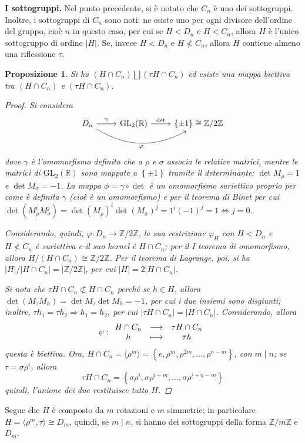 \documentclass[11pt]{scrartcl}
\theoremstyle{style1}
\newtheorem{prop}{Proposizione}[section]
\numberwithin{equation}{subsection}
\renewcommand{\textbf}[1]{\textsf{\bfseries #1}}
\begin{document}
 \textbf{I sottogruppi.} 
Nel punto precedente, si \`e notato che $C_n$ \`e uno dei sottogruppi.
Inoltre, i sottogruppi di $C_n$ sono noti: ne esiste uno per ogni divisore dell'ordine del gruppo, cio\`e $n$ in questo caso, per cui se $H < D_n$ e $H < C_n$, allora $H$ \`e l'unico sottogruppo di ordine $\lvert H \rvert $.
Se, invece $H< D_n$ e $H \not < C_n$, allora $H$ contiene almeno una riflessione $\tau $.
\begin{prop}
	Si ha $(H \cap C_n) \bigsqcup (\tau H \cap C_n) $ ed esiste una mappa biettiva tra $(H\cap C_n)$ e $(\tau H\cap C_n)$.
	\begin{proof}
		Si considera 
	\[
\begin{tikzcd}
D_n \arrow[r, "\gamma"] 
    \arrow[rr, bend right=30, "{\varphi }"'] & 
\mathrm{GL}_2(\mathbb{R}) \arrow[r, "\det"] & \{\pm 1\}\cong \mathbb{Z}/2\mathbb{Z}
\end{tikzcd}
\]
dove $\gamma$ \`e l'omomorfismo definito che a $\rho $ e $\sigma $ associa le relative matrici, mentre le matrici di $\mathrm{GL} _2(\mathbb{R})$ sono mappate a $\left\{ \pm 1 \right\} $ tramite il determinante: $\det M_\rho  = 1$ e $\det M_\sigma = -1$.
La mappa $\phi = \gamma\circ \det$ \`e un omomorfismo suriettivo proprio per come \`e definita $\gamma$ (cio\`e \`e un omomorfismo) e per il teorema di Binet per cui $\det (M^i_\rho M^j_\sigma ) = \det(M_\rho )^i \det (M_\sigma )^j = 1 ^i (-1)^j = 1 \iff j= 0$.

Considerando, quindi, $\varphi  :D_n \to \mathbb{Z} / 2\mathbb{Z}$, la sua restrizione $\varphi _H$ con $H < D_n$ e $H\not < C_n$ \`e suriettiva e il suo kernel \`e $H\cap C_n$; per il I teorema di omomorfismo, allora $H / (H\cap C_n) \cong \mathbb{Z} / 2\mathbb{Z}$.
Per il teorema di Lagrange, poi, si ha $\lvert H \rvert / \lvert H\cap C_n \rvert = \lvert \mathbb{Z} / 2 \mathbb{Z} \rvert $, per cui $\lvert H \rvert  = 2 \lvert H\cap C_n \rvert $.

Si nota che $\tau H \cap C_n \not \subset H \cap C_n$ perch\'e se $h \in H$, allora $\det (M_\tau M_h) = \det M_\tau \det M_h = -1$, per cui i due insiemi sono disgiunti; inoltre, $\tau h_1 = \tau h_2 \Rightarrow h_1=h_2$, per cui $\lvert \tau H \cap C_n \rvert = \lvert H \cap C_n \rvert $.
Considerando, allora
\[
\psi  : 
\begin{array}
	{c c c}
	H \cap C_n & \longrightarrow  & \tau  H \cap C_n\\
	h & \longmapsto &\tau  h
\end{array}
\] 
questa \`e biettiva.
Ora, $H \cap C_n = \langle \rho ^m \rangle= \left\{ e ,\rho ^m , \rho ^{2m} ,\ldots,\rho ^{n - m}  \right\} $, con $m  \mid  n$; se $\tau  = \sigma  \rho ^i $, allora 
\[
\tau  H \cap C_n = \left\{ \sigma \rho ^i, \sigma \rho ^{i+m}, \ldots, \sigma \rho ^{i+n - m}   \right\} 
\] 
quindi, l'unione dei due restituisce tutto $H$.
\end{proof}
\end{prop}
\noindent Segue che $H$ \`e composto da $m$ rotazioni e $m$ simmetrie; in particolare $H = \langle \rho ^m , \tau  \rangle\cong D_m$, quindi, se $m  \mid  n$, si hanno dei sottogruppi della forma $\mathbb{Z} / m \mathbb{Z}$ e $D_m$.
\vspace{5pt}
\end{document}
